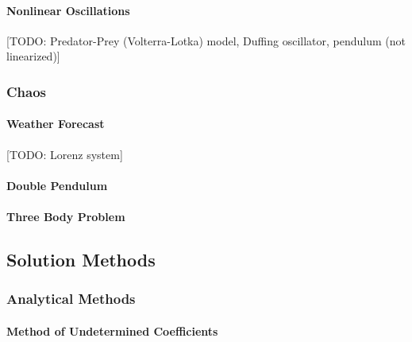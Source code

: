 \paragraph{Nonlinear Oscillations}
[TODO: Predator-Prey (Volterra-Lotka) model, Duffing oscillator, pendulum (not linearized)]


\subsubsection{Chaos}

\paragraph{Weather Forecast} [TODO: Lorenz system]

\paragraph{Double Pendulum}

\paragraph{Three Body Problem}






\subsection{Solution Methods}

\subsubsection{Analytical Methods}


\paragraph{Method of Undetermined Coefficients}

